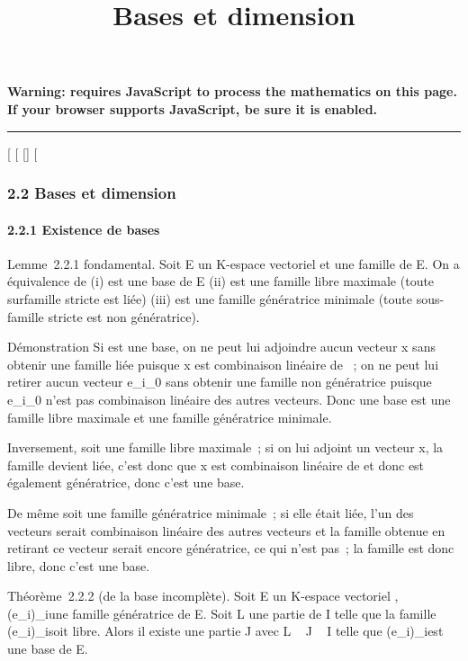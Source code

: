 \documentclass[]{article}
\title{Bases et dimension}
\author{}
\date{}
\begin{document}
\maketitle

\textbf{Warning: 
requires JavaScript to process the mathematics on this page.\\ If your
browser supports JavaScript, be sure it is enabled.}

\begin{center}\rule{3in}{0.4pt}\end{center}

[
[
[]
[

\subsubsection{2.2 Bases et dimension}

\paragraph{2.2.1 Existence de bases}

Lemme~2.2.1 fondamental. Soit E un K-espace vectoriel et  une famille
de E. On a équivalence de (i)  est une base de E (ii)  est une famille
libre maximale (toute surfamille stricte est liée) (iii)  est une
famille génératrice minimale (toute sous-famille stricte est non
génératrice).

Démonstration Si  est une base, on ne peut lui adjoindre aucun vecteur
x sans obtenir une famille liée puisque x est combinaison linéaire de
~; on ne peut lui retirer aucun vecteur e_i_0 sans
obtenir une famille non génératrice puisque e_i_0
n'est pas combinaison linéaire des autres vecteurs. Donc une base est
une famille libre maximale et une famille génératrice minimale.

Inversement, soit  une famille libre maximale~; si on lui adjoint un
vecteur x, la famille devient liée, c'est donc que x est combinaison
linéaire de  et donc  est également génératrice, donc c'est une base.

De même soit  une famille génératrice minimale~; si elle était liée,
l'un des vecteurs serait combinaison linéaire des autres vecteurs et la
famille obtenue en retirant ce vecteur serait encore génératrice, ce qui
n'est pas~; la famille est donc libre, donc c'est une base.

Théorème~2.2.2 (de la base incomplète). Soit E un K-espace vectoriel ,
(e_i)_i\inI une famille génératrice de E. Soit L une
partie de I telle que la famille (e_i)_i\inL soit libre.
Alors il existe une partie J avec L \subset~ J \subset~ I telle que
(e_i)_i\inJ est une base de E.
\end{document}
